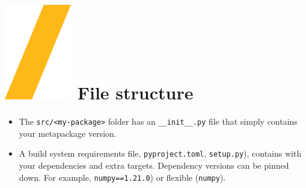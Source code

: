 \documentclass[a0paper,fleqn]{src/betterposter}
\begin{document}
{\section{\includegraphics[height=\fontcharht\font`\S]{img/general/slash.png} File structure}
\vspace{-2cm}
\begin{itemize}
    \item The \texttt{src/<my-package>} folder has an \texttt{\_\_init\_\_.py} file that simply contains your metapackage version.
    \item A build system requirements file, \texttt{pyproject.toml}, \texttt{setup.py}), contains with your dependencies and extra targets. Dependency versions can be pinned down. For example, \texttt{numpy==1.21.0}) or flexible (\texttt{numpy}).
\end{itemize}

\vfill

}{
}
\end{document}
